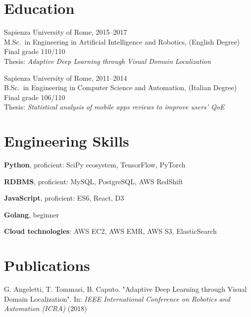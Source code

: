 \documentclass[margin]{res}
\begin{document}
\begin{resume}
        \section{Education}
            Sapienza University of Rome, \hfill 2015--2017 \\
            M.Sc.\ in Engineering in Artificial Intelligence and Robotics, (English Degree) \\
            Final grade 110/110 \\
            Thesis: \textit{Adaptive Deep Learning through Visual Domain Localization}

            Sapienza University of Rome, \hfill 2011--2014 \\
            B.Sc.\ in Engineering in Computer Science and Automation, (Italian Degree) \\
            Final grade 106/110 \\
            Thesis: \textit{Statistical analysis of mobile apps reviews to improve users' QoE}
        
        \section{Engineering Skills}
        \begin{description}
            \item \textbf{Python}, proficient: SciPy ecosystem, TensorFlow, PyTorch
            \item \textbf{RDBMS}, proficient: MySQL, PostgreSQL, AWS RedShift
            \item \textbf{JavaScript}, proficient: ES6, React, D3
            \item \textbf{Golang}, beginner
            \item \textbf{Cloud technologies}: AWS EC2, AWS EMR, AWS S3, ElasticSearch
        \end{description}

        \section{Publications}
        \begin{description}
            \item G. Angeletti, T. Tommasi, B. Caputo.
                "Adaptive Deep Learning through Visual Domain Localization".
                In: \textit{IEEE International Conference on Robotics and Automation (ICRA)} (2018)
        \end{description}


\end{resume}
\end{document}
